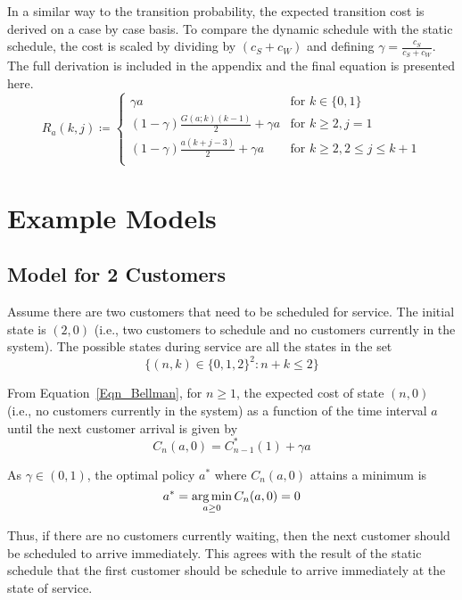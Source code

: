 In a similar way to the transition probability, the expected transition cost is derived on a case by case basis. To compare the dynamic schedule with the static schedule, the cost is scaled by dividing by $(c_{S} + c_{W})$ and defining $\gamma = \frac{c_{S}}{c_{S} + c_{W}}$. The full derivation is included in the appendix and the final equation is presented here.
\begin{equation}
	R_{a} (k, j) \coloneqq \begin{cases}
		\gamma a & \text{for $k \in \{ 0, 1 \}$} \\
		(1 - \gamma) \frac{G (a; k) (k - 1)}{2} + \gamma a & \text{for $k \geq 2, j = 1$} \\
		(1 - \gamma) \frac{a (k + j - 3)}{2} + \gamma a & \text{for $k \geq 2, 2 \leq j \leq k + 1$} \\
	\end{cases}
\end{equation}

\section{Example Models}
\subsection{Model for 2 Customers}
Assume there are two customers that need to be scheduled for service. The initial state is $(2, 0)$ (i.e., two customers to schedule and no customers currently in the system). The possible states during service are all the states in the set
\begin{equation}
	\Big\{ (n, k) \in \{ 0, 1, 2 \}^{2} : n + k \leq 2 \Big\}
\end{equation}

From Equation~\ref{Eqn_Bellman}, for $n \geq 1$, the expected cost of state $(n, 0)$ (i.e., no customers currently in the system) as a function of the time interval $a$ until the next customer arrival is given by
\begin{equation}
	C_{n} (a, 0) = C_{n - 1}^{*} (1) + \gamma a 	
\end{equation}

As $\gamma \in (0, 1)$, the optimal policy $a^{*}$ where $C_{n} (a, 0)$ attains a minimum is
\begin{equation}
	a^{*} = \operatorname*{arg\,min}_{a \geq 0} C_{n} (a, 0) = 0
	\label{eqn:Dynamic_No_Waiting}
\end{equation}

Thus, if there are no customers currently waiting, then the next customer should be scheduled to arrive immediately. This agrees with the result of the static schedule that the first customer should be schedule to arrive immediately at the state of service.

